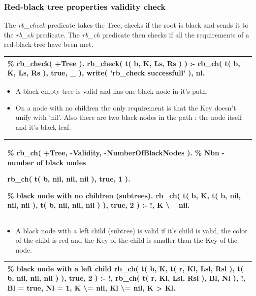 \documentclass{article}
\newenvironment{code}{\obeycr\begin{it}\nopagebreak\addvspace{1ex}\noindent\footnotesize\begin{tabular}{|p{0.95\textwidth}|}\hline}{\\\hline\end{tabular}\par\addvspace{1ex}\end{it}\restorecr}
\newcommand{\inlinecode}[1]{\textit{#1}}
\begin{document}
\subsubsection[Validity]{Red-black tree properties validity check}
The \inlinecode{rb\_check} predicate takes the Tree, checks if the root is black and sends it to the \inlinecode{rb\_ch} predicate. The \inlinecode{rb\_ch} predicate then checks if all the requirements of a red-black tree have been met.

\begin{code}
\% rb\_check( +Tree ).
rb\_check( t( b, K, Ls, Rs ) ) :-
\hspace{2ex}rb\_ch( t( b, K, Ls, Rs ), true, \_ ),
\hspace{2ex}write( 'rb\_check successfull' ), nl.
\end{code}

\begin{itemize}
\item A black empty tree is valid and has one black node in it's path. 
\item On a node with no children the only requirement is that the Key doesn't unify with `nil'. Also there are two black nodes in the path : the node itself and it's black leaf.
\end{itemize}

\begin{code}
\% rb\_ch( +Tree, -Validity, -NumberOfBlackNodes ).
\% Nbn - number of black nodes

rb\_ch( t( b, nil, nil, nil ), true, 1 ).

\% black node with no children (subtrees).
rb\_ch( t( b, K, t( b, nil, nil, nil ), t( b, nil, nil, nil ) ), true, 2 ) :- !, 
\hspace{2ex}K \textbackslash{}= nil.
\end{code}

\begin{itemize}
\item
A black node with a left child (subtree) is valid if it's child is valid, the color of the child is red and the Key of the child is smaller than the Key of the node.
\end{itemize}

\begin{code}
\% black node with a left child
rb\_ch( t( b, K, t( r, Kl, Lsl, Rsl ), t( b, nil, nil, nil ) ), true, 2 ) :- !, 
\hspace{2ex}rb\_ch( t( r, Kl, Lsl, Rsl ), Bl, Nl ), !, 
\hspace{2ex}Bl = true,
\hspace{2ex}Nl = 1,
\hspace{2ex}K \textbackslash{}= nil,
\hspace{2ex}Kl \textbackslash{}= nil,
\hspace{2ex}K \textgreater{} Kl.
\end{code}
\end{document}
